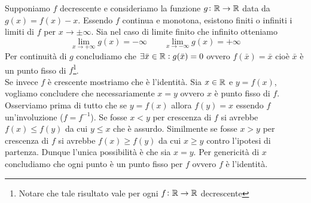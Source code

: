 \documentclass[a4paper]{article}\par \usepackage{style}\par
\begin{document}
Supponiamo $ f $ decrescente e consideriamo la funzione $ g \colon \mathbb{R} \to \mathbb{R} $ data da $ g(x) = f(x) - x $. Essendo $ f $ continua e monotona, esistono finiti o infiniti i limiti di $ f $ per $ x \to \pm \infty $. Sia nel caso di limite finito che infinito otteniamo
\begin{equation*}
  \lim_{x \to +\infty} g(x) = -\infty \qquad \lim_{x \to -\infty} g(x) = +\infty
\end{equation*}
Per continuità di $ g $ concludiamo che $ \exists \bar{x} \in \mathbb{R} : g(\bar{x}) = 0 $ ovvero $ f(\bar{x}) = \bar{x} $ cioè $ \bar{x} $ è un punto fisso di $ f $\footnote{Notare che tale risultato vale per ogni $ f \colon \mathbb{R} \to \mathbb{R} $ decrescente}. \\
Se invece $ f $ è crescente mostriamo che è l'identità. Sia $ x \in \mathbb{R} $ e $ y = f(x) $, vogliamo concludere che necessariamente $ x = y $ ovvero $ x $ è punto fisso di $ f $. Osserviamo prima di tutto che se $ y = f(x) $ allora $ f(y) = x $ essendo $ f $ un'involuzione ($ f = f^{-1} $). Se fosse $ x < y $ per crescenza di $ f $ si avrebbe $ f(x) \leq f(y) $ da cui $ y \leq x $ che è assurdo. Similmente se fosse $ x > y $ per crescenza di $ f $ si avrebbe $ f(x) \geq f(y) $ da cui $ x \geq y $ contro l'ipotesi di partenza. Dunque l'unica possibilità è che sia $ x = y $. Per genericità di $ x $ concludiamo che ogni punto è un punto fisso per $ f $ ovvero $ f $ è l'identità.\par \appendix
\end{document}
